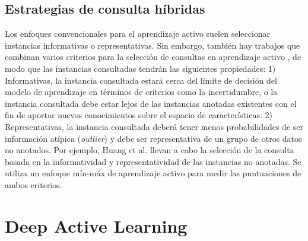 \subsection{Estrategias de consulta híbridas}
Los enfoques convencionales para el aprendizaje activo suelen seleccionar instancias informativas o representativas. Sin embargo, también hay trabajos que combinan varios criterios para la selección de consultas en aprendizaje activo \cite{dasgupta2009analysis, hoi2008semisupervised, huang2014active}, de modo que las instancias consultadas tendrán las siguientes propiedades:
1) Informativas, la instancia consultada estará cerca del límite de decisión del modelo de aprendizaje en términos de criterios como la incertidumbre, o la instancia consultada debe estar lejos de las instancias anotadas existentes con el fin de aportar nuevos conocimientos sobre el espacio de características. 2) Representativas, la instancia consultada deberá tener menos probabilidades de ser información atípica (\textit{outlier}) y debe ser representativa de un grupo de otros datos no anotados. Por ejemplo, Huang et al. \cite{huang2014active} llevan a cabo la selección de la consulta basada en la informatividad
y representatividad de las instancias no anotadas. Se utiliza un enfoque mín-máx de aprendizaje activo para medir las puntuaciones de ambos criterios. 




\section{Deep Active Learning}


